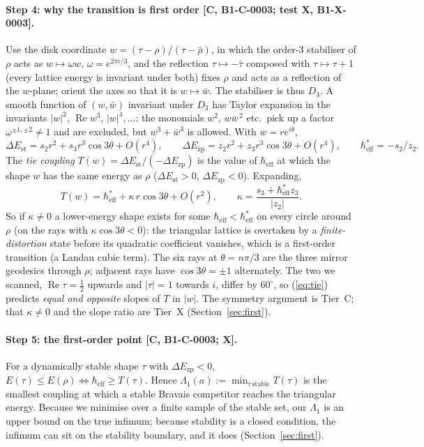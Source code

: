 \documentclass[10pt]{article}
\newcommand{\tier}[1]{\textsf{[#1]}}
\newcommand{\hb}{\hbar_{\mathrm{eff}}}
\newcommand{\Ezp}{E_{\mathrm{zp}}}
\newcommand{\Est}{E_{\mathrm{st}}}
\renewcommand{\Re}{\operatorname{Re}}
\begin{document}
\paragraph{Step 4: why the transition is first order \tier{C, B1-C-0003; test X, B1-X-0003}.} Use the disk coordinate $w=(\tau-\rho)/(\tau-\bar\rho)$, in which the order-3 stabiliser of $\rho$ acts as $w\mapsto\omega w$, $\omega=e^{2\pi i/3}$, and the
reflection $\tau\mapsto-\bar\tau$ composed with $\tau\mapsto\tau+1$ (every lattice energy is invariant under both) fixes $\rho$ and acts as a reflection of the $w$-plane; orient the axes so that it is $w\mapsto\bar w$. The stabiliser is thus $D_3$. A smooth function of $(w,\bar w)$ invariant under $D_3$ has Taylor expansion
in the invariants $|w|^2$, $\Re w^3$, $|w|^4,\dots$: the monomials $w^2$, $w\bar w^{\,2}$ etc.\ pick up a factor $\omega^{\pm1,\pm2}\neq1$ and are excluded, but $w^3+\bar w^3$ is allowed. With $w=re^{i\theta}$,
\[\Delta\Est=s_2r^2+s_3r^3\cos3\theta+O(r^4),\qquad \Delta\Ezp=z_2r^2+z_3r^3\cos3\theta+O(r^4),\qquad \hb^*=-s_2/z_2.\]
The \emph{tie coupling} $T(w)=\Delta\Est/(-\Delta\Ezp)$ is the value of $\hb$ at which the shape $w$ has the same energy as $\rho$ ($\Delta\Est>0$, $\Delta\Ezp<0$). Expanding,
\begin{equation}\label{eq:tie}T(w)=\hb^*+\kappa\,r\cos3\theta+O(r^2),\qquad \kappa=\frac{s_3+\hb^*z_3}{|z_2|}.\end{equation}
So if $\kappa\ne0$ a lower-energy shape exists for some $\hb<\hb^*$ on every circle around $\rho$ (on the rays with $\kappa\cos3\theta<0$): the triangular lattice is overtaken by a \emph{finite-distortion} state before its
quadratic coefficient vanishes, which is a first-order transition (a Landau cubic term). The six rays at $\theta=n\pi/3$ are the three mirror geodesics through $\rho$; adjacent rays have $\cos3\theta=\pm1$ alternately. The two
we scanned, $\Re\tau=\tfrac12$ upwards and $|\tau|=1$ towards $i$, differ by $60^\circ$, so (\ref{eq:tie}) predicts \emph{equal and opposite} slopes of $T$ in $|w|$. The symmetry argument is Tier~C; that $\kappa\ne0$ and the slope ratio are Tier~X (Section~\ref{sec:first}).

\paragraph{Step 5: the first-order point \tier{C, B1-C-0003; X}.} For a dynamically stable shape $\tau$ with $\Delta\Ezp<0$, $E(\tau)\le E(\rho)\iff\hb\ge T(\tau)$. Hence $\Lambda_1(a):=\min_{\tau\ \mathrm{stable}}T(\tau)$ is the smallest coupling at which a stable Bravais
competitor reaches the triangular energy. Because we minimise over a finite sample of the stable set, our $\Lambda_1$ is an upper bound on the true infimum; because stability is a closed condition, the infimum can sit on the stability boundary, and it does (Section~\ref{sec:first}).
\end{document}
